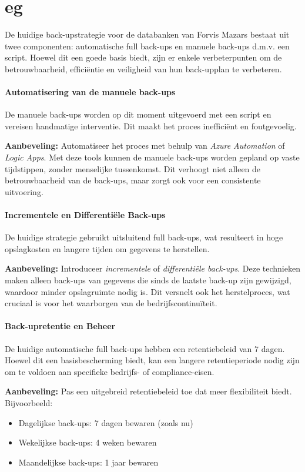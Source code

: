 \chapter{eg}%
\label{ch:analyse}
De huidige back-upstrategie voor de databanken van Forvis Mazars bestaat uit twee componenten: automatische full back-ups en manuele back-ups d.m.v. een script. Hoewel dit een goede basis biedt, zijn er enkele verbeterpunten om de betrouwbaarheid, efficiëntie en veiligheid van hun back-upplan te verbeteren.

\subsubsection{Automatisering van de manuele back-ups}
De manuele back-ups worden op dit moment uitgevoerd met een script en vereisen handmatige interventie. Dit maakt het proces inefficiënt en foutgevoelig. 

\textbf{Aanbeveling:} Automatiseer het proces met behulp van \textit{Azure Automation} of \textit{Logic Apps}. Met deze tools kunnen de manuele back-ups worden gepland op vaste tijdstippen, zonder menselijke tussenkomst. Dit verhoogt niet alleen de betrouwbaarheid van de back-ups, maar zorgt ook voor een consistente uitvoering.

\subsubsection{Incrementele en Differentiële Back-ups}
De huidige strategie gebruikt uitsluitend full back-ups, wat resulteert in hoge opslagkosten en langere tijden om gegevens te herstellen.

\textbf{Aanbeveling:} Introduceer \textit{incrementele} of \textit{differentiële back-ups}. Deze technieken maken alleen back-ups van gegevens die sinds de laatste back-up zijn gewijzigd, waardoor minder opslagruimte nodig is. Dit versnelt ook het herstelproces, wat cruciaal is voor het waarborgen van de bedrijfscontinuïteit.

\subsubsection{Back-upretentie en Beheer}
De huidige automatische full back-ups hebben een retentiebeleid van 7 dagen. Hoewel dit een basisbescherming biedt, kan een langere retentieperiode nodig zijn om te voldoen aan specifieke bedrijfs- of compliance-eisen.

\textbf{Aanbeveling:} Pas een uitgebreid retentiebeleid toe dat meer flexibiliteit biedt. Bijvoorbeeld:
\begin{itemize}
    \item Dagelijkse back-ups: 7 dagen bewaren (zoals nu)
    \item Wekelijkse back-ups: 4 weken bewaren
    \item Maandelijkse back-ups: 1 jaar bewaren
\end{itemize}


